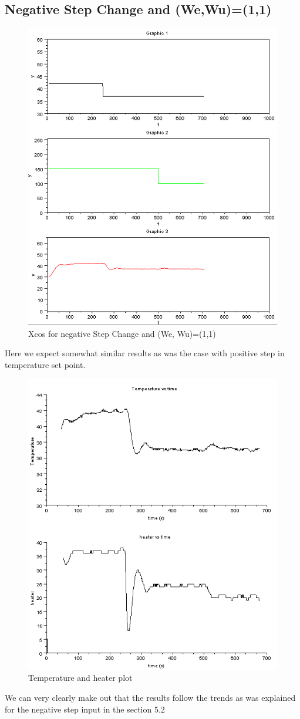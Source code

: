 \subsection{Negative Step Change and (We,Wu)=(1,1)}
\begin{figure}[H]
\centering
  \includegraphics[width=0.8\linewidth]{mpc/2_1.PNG}
  \caption{Xcos for negative Step Change and (We, Wu)=(1,1)}
\end{figure}
Here we expect somewhat similar results as was the case with positive step in temperature set point.
\begin{figure}[H]
\centering
  \includegraphics[width=0.8\linewidth]{mpc/2_1_heater_final.png}
  \caption{Temperature and heater plot}
\end{figure}
We can very clearly make out that the results follow the trends as was explained for the negative step input in the section 5.2


